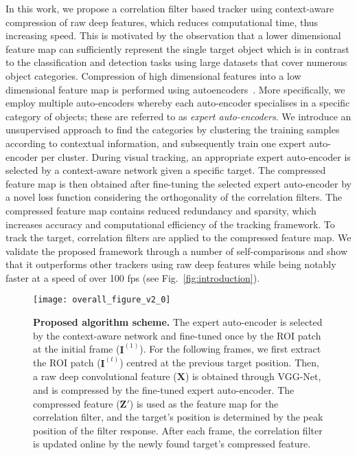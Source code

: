 \documentclass[10pt,twocolumn,letterpaper]{article}
\begin{document}
In this work, we propose a correlation filter based tracker using context-aware compression of raw deep features, which reduces computational time, thus increasing speed.
This is motivated by the observation that a lower dimensional feature map can sufficiently represent the single target object which is in contrast to the classification and detection tasks using large datasets that cover numerous object categories.
Compression of high dimensional features into a low dimensional feature map is performed using autoencoders~\cite{ref:dAE, ref:ae1, ref:ae2, ref:ae3}.
More specifically, we employ multiple auto-encoders whereby each auto-encoder specialises in a specific category of objects; these are referred to as \textit{expert auto-encoders}.
We introduce an unsupervised approach to find the categories by clustering the training samples according to contextual information, and subsequently train one expert auto-encoder per cluster.
During visual tracking, an appropriate expert auto-encoder is selected by a context-aware network given a specific target. 
The compressed feature map is then obtained after fine-tuning the selected expert auto-encoder by a novel loss function considering the orthogonality of the correlation filters.
The compressed feature map contains reduced redundancy and sparsity, which increases accuracy and computational efficiency of the tracking framework.
To track the target, correlation filters are applied to the compressed feature map.
We validate the proposed framework through a number of self-comparisons and show that it outperforms other trackers using raw deep features while being notably faster at a speed of over 100 fps (see Fig.~\ref{fig:introduction}).


 \begin{figure*}[t]
\centering
    \texttt{[image: overall\_figure\_v2\_0]}
    \vspace{-0.1cm}
    \caption{ {\bf{Proposed algorithm scheme.}} The expert auto-encoder is selected by the context-aware network and fine-tuned once by the ROI patch at the initial frame ($\mathbf{I}^{(1)}$). For the following frames, we first extract the ROI patch ($\mathbf{I}^{(t)}$) centred at the previous target position. Then, a raw deep convolutional feature ($\mathbf{X}$) is obtained through VGG-Net, and is compressed by the fine-tuned expert auto-encoder. The compressed feature ($\mathbf{Z}'$) is used as the feature map for the correlation filter, and the target's position is determined by the peak position of the filter response. After each frame, the correlation filter is updated online by the newly found target's compressed feature.}
    \label{fig:framework}
\vspace{-0.4cm}
\end{figure*}
\end{document}
